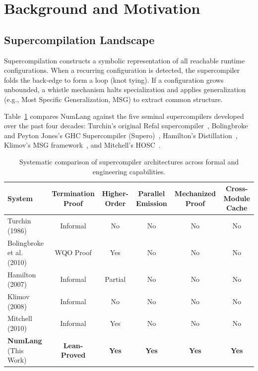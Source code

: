 \section{Background and Motivation}
\label{sec:background}

\subsection{Supercompilation Landscape}
Supercompilation constructs a symbolic representation of all reachable runtime configurations. When a recurring configuration is detected, the supercompiler folds the back-edge to form a loop (knot tying). If a configuration grows unbounded, a whistle mechanism halts specialization and applies generalization (e.g., Most Specific Generalization, MSG) to extract common structure.

Table~\ref{tab:competitor_comparison} compares NumLang against the five seminal supercompilers developed over the past four decades: Turchin's original Refal supercompiler~\cite{turchin1986concept}, Bolingbroke and Peyton Jones's GHC Supercompiler (Supero)~\cite{bolingbroke2010supercompilation}, Hamilton's Distillation~\cite{hamilton2007distillation}, Klimov's MSG framework~\cite{klimov2008generalization}, and Mitchell's HOSC~\cite{mitchell2010hosc}.

\begin{table}[t]
\centering
\caption{Systematic comparison of supercompiler architectures across formal and engineering capabilities.}
\label{tab:competitor_comparison}
\small
\begin{tabular}{lccccc}
\toprule
\textbf{System} & \textbf{Termination Proof} & \textbf{Higher-Order} & \textbf{Parallel Emission} & \textbf{Mechanized Proof} & \textbf{Cross-Module Cache} \\
\midrule
Turchin (1986)~\cite{turchin1986concept} & Informal & No & No & No & No \\
Bolingbroke et al. (2010)~\cite{bolingbroke2010supercompilation} & WQO Proof & Yes & No & No & No \\
Hamilton (2007)~\cite{hamilton2007distillation} & Informal & Partial & No & No & No \\
Klimov (2008)~\cite{klimov2008generalization} & Informal & No & No & No & No \\
Mitchell (2010)~\cite{mitchell2010hosc} & Informal & Yes & No & No & No \\
\textbf{NumLang} (This Work) & \textbf{Lean-Proved} & \textbf{Yes} & \textbf{Yes} & \textbf{Yes} & \textbf{Yes} \\
\bottomrule
\end{tabular}
\end{table}

